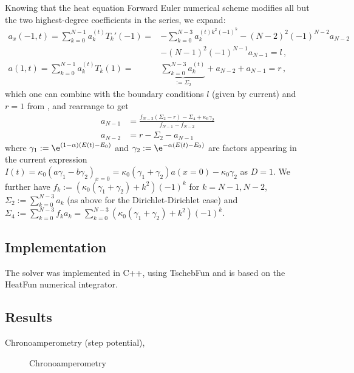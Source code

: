 \documentclass{prettytex/ox/mmsc-special-topic}
\begin{document}
  Knowing that the heat equation Forward Euler numerical scheme modifies all but the two highest-degree coefficients in the series, we expand:
  \begin{align*}
    a_x(-1, t) = \sum_{k=0}^{N-1} a_k^{(t)} T_k'(-1) =   & -\sum_{k=0}^{N-3} a_k^{(t) k^2 (-1)^{k}} - (N-2)^2 (-1)^{N-2} a_{N-2}                                            \\
                                                         & -(N-1)^2 (-1)^{N-1} a_{N-1} = l\,,                                                                               \\
    a(1, t)    = \sum_{k=0}^{N-1} a_k^{(t)} T_k(1)     = & \underbrace{\sum_{k=0}^{N-3} a_k^{(t)}}_{:= \Sigma_2}              + a_{N-2}                    + a_{N-1} = r\,,
  \end{align*}
  which one can combine with the boundary conditions $l$ (given by current) and $r = 1$ from , and rearrange to get
  \begin{align}
    a_{N-1} & = \frac{f_{N-2}(\Sigma_2 - r) - \Sigma_4 + \kappa_0 \gamma_2}{f_{N-1} - f_{N-2}} \\
    a_{N-2} & = r - \Sigma_2 - a_{N-1}
  \end{align}
  where $\gamma_1 := \e^{(1-\alpha)(E(t) - E_0)}$ and $\gamma_2 := \e^{-\alpha(E(t) - E_0)}$ are factors appearing in the current expression $I(t) = \kappa_0 \left(a \gamma_1 - b \gamma_2\right)_{x=0} = \kappa_0 (\gamma_1 + \gamma_2) a(x=0) - \kappa_0 \gamma_2$ as $D=1$.
  We further have $f_k := \left(\kappa_0 (\gamma_1 + \gamma_2) + k^2\right)(-1)^k$ for $k = N-1, N-2$, $\Sigma_2 := \sum_{k=0}^{N-3} a_k$ (as above for the Dirichlet-Dirichlet case) and $\Sigma_4 := \sum_{k=0}^{N-3} f_k a_k = \sum_{k=0}^{N-3} \left(\kappa_0 (\gamma_1 + \gamma_2) + k^2\right)(-1)^k$.

  \subsection{Implementation}
  The solver was implemented in C++, using TschebFun and is based on the HeatFun numerical integrator.


  \subsection{Results}
  Chronoamperometry (step potential),

  \begin{figure}[H]
    \centering
    \caption{Chronoamperometry}
    \label{fig:chronoamperometry}
  \end{figure}
\end{document}
